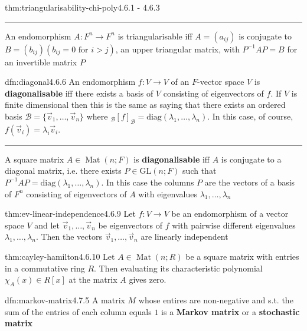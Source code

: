 \documentclass[landscape, 8pt]{extarticle}
\DeclareMathOperator{\Mat}{Mat}
\begin{document}
\begin{multicols}{3}
\begin{thm}[]{thm:triangularisability-chi-poly}{4.6.1 - 4.6.3}
    
    \noindent\rule{\textwidth}{0.2pt}

    An endomorphism $A : F^{n} \to F^{n}$ is triangularisable iff $A = (a_{ij})$ is conjugate to $B = (b_{ij})(b_{ij} = 0 \text{ for $i > j$})$, an upper triangular matrix, with $P^{-1} AP=B$ for an invertible matrix $P$
\end{thm}

\begin{dfn}[Diagonalisability]{dfn:diagonal}{4.6.6}
    An endomorphism $f : V \to V$ of an $F$-vector space $V$ is \textbf{diagonalisable} iff there exists a basis of $V$ consisting of eigenvectors of $f$. If $V$ is finite dimensional then this is the same as saying that there exists an ordered basis $\mathcal{B} = \{\vec{v}_{1},\dots,\vec{v}_{n}\}$ where $_{\mathcal{B}}[f]_{\mathcal{B}} = \text{diag}(\lambda_{1},\dots,\lambda_{n})$. In this case, of course, $f(\vec{v}_{i}) = \lambda_{i}\vec{v}_{i}$.
    
    \noindent\rule{\textwidth}{0.2pt}
    A square matrix $A\in \Mat(n;F)$ is \textbf{diagonalisable} iff $A$ is conjugate to a diagonal matrix, i.e. there exists $P \in \text{GL}(n;F)$ such that $P^{-1}AP = \text{diag}(\lambda_{1},\dots,\lambda_{n})$. In this case the columns $P$ are the vectors of a basis of $F^{n}$ consisting of eigenvectors of $A$ with eigenvalues $\lambda_{1},\dots,\lambda_{n}$
\end{dfn}

\begin{thm}{thm:ev-linear-independence}{4.6.9}
    Let $f : V\to V$ be an endomorphism of a vector space $V$ and let $\vec{v}_{1},\dots,\vec{v}_{n}$ be eigenvectors of $f$ with pairwise different eigenvalues $\lambda_{1},\dots,\lambda_{n}$. Then the vectors $\vec{v}_{1},\dots,\vec{v}_{n}$ are linearly independent
\end{thm}

\begin{thm}{thm:cayley-hamilton}{4.6.10}
    Let $A\in \Mat(n;R)$ be a square matrix with entries in a commutative ring $R$. Then evaluating its characteristic polynomial $\chi_{A}(x)\in R[x]$ at the matrix $A$ gives zero.
\end{thm}

\begin{dfn}{dfn:markov-matrix}{4.7.5}
    A matrix $M$ whose entires are non-negative and s.t. the sum of the entries of each column equals $1$ is a \textbf{Markov matrix} or a \textbf{stochastic matrix}


\end{dfn}
\end{multicols}
\end{document}

